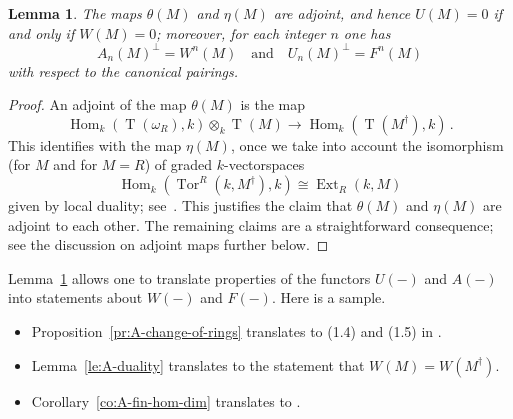 \documentclass{amsart}
\numberwithin{equation}{section}
\theoremstyle{plain}
\newtheorem{lemma}[equation]{Lemma}
\theoremstyle{definition}
\theoremstyle{remark}
\newcommand{\ext}{\operatorname{Ext}}
\newcommand{\Hom}{\operatorname{Hom}}
\newcommand{\tee}{\operatorname{T}}
\newcommand{\tor}{\operatorname{Tor}}
\begin{document}
\begin{lemma}
\label{le:AW}
The maps $\theta(M)$ and $\eta(M)$ are adjoint, and hence $U(M)=0$ if and only if $W(M)=0$; moreover, for each integer $n$ one has 
\[
A_n(M)^\perp = W^n(M) \quad\text{and}\quad U_n(M)^\perp = F^n(M)
\]
with respect to the canonical pairings.
\end{lemma}

\begin{proof}
    An adjoint of the map $\theta(M)$ is the map 
    \[
    \Hom_k(\tee(\omega_R),k)\otimes_k \tee(M)\longrightarrow \Hom_k(\tee(M^\dagger),k)\,.
    \]
    This identifies with the map $\eta(M)$, once we take into account the isomorphism (for $M$ and for $M=R$) of graded $k$-vectorspaces
    \[
    \Hom_k(\tor^R(k,M^\dagger),k) \cong \ext_R(k,M)
    \]
    given by local duality; see~\cite[Section 47.18]{StacksProject}. This justifies the claim that $\theta(M)$ and $\eta(M)$ are adjoint to each other. The remaining claims are a straightforward consequence; see the discussion on adjoint maps further below.
\end{proof}

Lemma~\ref{le:AW} allows one to translate properties of the functors $U(-)$ and $A(-)$ into statements about $W(-)$ and $F(-)$. Here is a sample. 

\begin{itemize}
    \item Proposition~\ref{pr:A-change-of-rings} translates to  (1.4) and (1.5) in \cite{Lescot:1986}.
    \item Lemma~\ref{le:A-duality} translates to the statement that $W(M)=W(M^\dagger)$.
    \item Corollary~\ref{co:A-fin-hom-dim} translates to \cite[1.7, 1.8]{Lescot:1986}.
    \end{itemize}
\end{document}
